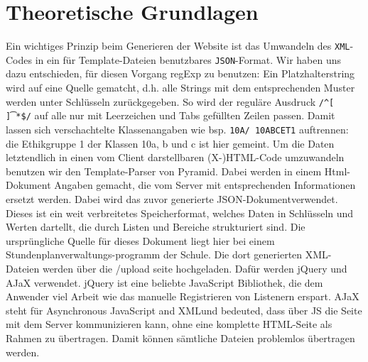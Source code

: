 \chapter{Theoretische Grundlagen}


Ein wichtiges Prinzip beim Generieren der Website ist das Umwandeln des \texttt{XML}-Codes in ein für Template-Dateien benutzbares \texttt{JSON}-Format. Wir haben uns dazu entschieden, für diesen Vorgang regExp zu benutzen: Ein Platzhalterstring wird auf eine Quelle gematcht, d.h. alle Strings mit dem entsprechenden Muster werden unter Schlüsseln zurückgegeben. So wird der reguläre Ausdruck \texttt{/^[ \t]*\$/} auf alle nur mit Leerzeichen und Tabs gefüllten Zeilen passen. Damit lassen sich verschachtelte Klassenangaben wie bsp. \texttt{10A/ 10ABCET1} auftrennen: die Ethikgruppe 1 der Klassen 10a, b und c ist hier gemeint. Um die Daten letztendlich in einen vom Client darstellbaren (X-)HTML-Code umzuwandeln benutzen wir den Template-Parser von Pyramid. Dabei werden in einem Html-Dokument Angaben gemacht, die vom Server mit entsprechenden Informationen ersetzt werden. Dabei wird das zuvor generierte JSON-Dokumentverwendet. Dieses ist ein weit verbreitetes Speicherformat, welches Daten in Schlüsseln und Werten dartellt, die durch Listen und Bereiche strukturiert sind. Die ursprüngliche Quelle für dieses Dokument liegt hier bei einem Stundenplanverwaltungs-programm der Schule. Die dort generierten XML-Dateien werden über die /upload seite hochgeladen. Dafür werden jQuery und AJaX verwendet. jQuery ist eine beliebte JavaScript Bibliothek, die dem Anwender viel Arbeit wie das manuelle Registrieren von Listenern erspart. AJaX steht für \glqq Asynchronous JavaScript and XML\grqq und bedeuted, dass über JS die Seite mit dem Server kommunizieren kann, ohne eine komplette HTML-Seite als Rahmen zu übertragen. Damit können sämtliche Dateien problemlos übertragen werden.